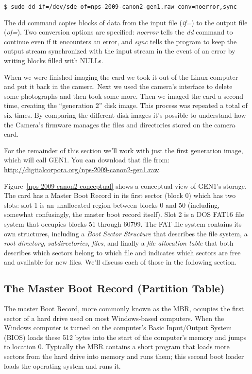 \documentclass[11pt,letter]{book}
\newcommand{\figref}[1]{Figure~\ref{#1}\xspace}
\begin{document}
\begin{Verbatim}
$ sudo dd if=/dev/sde of=nps-2009-canon2-gen1.raw conv=noerror,sync
\end{Verbatim} 

The dd command copies blocks of data from the input file (\emph{if=})
to the output file (\emph{of=}). Two conversion options are
specified: \emph{noerror} tells the \emph{dd} command to continue even
if it encounters an error, and \emph{sync} tells the program to keep
the output stream synchronized with the input stream in the event of
an error by writing blocks filled with NULLs.  

When we were finished imaging the card we took it out of the Linux
computer and put it back in the camera. Next we used the camera's
interface to delete some photographs and then took some more. Then we
imaged the card a second time, creating the ``generation 2'' disk
image. This process was repeated a total of six times. By comparing
the different disk images it's possible to understand how the Camera's
firmware manages the files and directories stored on the camera card.

For the remainder of this section we'll work with just the first
generation image, which will call GEN1. You can download that file from: \url{http://digitalcorpora.org/nps-2009-canon2-gen1.raw}.


\figref{nps-2009-canon2-conceptual} shows a conceptual view of
GEN1's storage. The card has a Master Boot Record in its
first sector (block 0) which has two slots: slot 1 is an unallocated
region between blocks 0 and 50 (including, somewhat confusingly, the
master boot record itself). Slot 2 is a DOS FAT16 file system that
occupies blocks 51 through 60799. The FAT file system contains its own
structures, including a \emph{Boot Sector Structure} that describes the
file system, a \emph{root directory}, \emph{subdirectories},
\emph{files}, and finally a \emph{file allocation table} that both
describes which sectors belong to which file and indicates which
sectors are free and available for new files. We'll discuss each of
those in the following section.

\subsection{The Master Boot Record (Partition Table)}

The master Boot Record, more commonly known as the MBR, occupies the first
sector of a hard drive used on most Windows-based computers. When the
Windows computer is turned on the computer's Basic Input/Output
System (BIOS) loads these 512 bytes into the start of the computer's
memory and jumps to location 0. Typically the MBR contains a short
program that loads more sectors from the hard drive into memory and
runs them; this second boot loader loads the operating system and runs
it.
\end{document}
